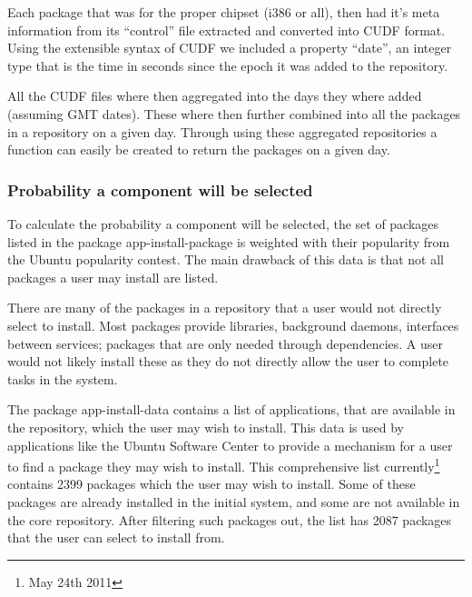Each package that was for the proper chipset (i386 or all), then had it's meta information from its ``control'' file extracted and converted into CUDF format.
Using the extensible syntax of CUDF we included a property ``date'', an integer type that is the time in seconds since the epoch it was added to the repository.

All the CUDF files where then aggregated into the days they where added (assuming GMT dates).
These where then further combined into all the packages in a repository on a given day.
Through using these aggregated repositories a function can easily be created to return the packages on a given day.

\subsubsection{Probability a component will be selected}
To calculate the probability a component will be selected, 
the set of packages listed in the package app-install-package is weighted with their popularity from the Ubuntu popularity contest.
The main drawback of this data is that not all packages a user may install are listed.

There are many of the packages in a repository that a user would not directly select to install.
Most packages provide libraries, background daemons, interfaces between services; packages that are only needed through dependencies.
A user would not likely install these as they do not directly allow the user to complete tasks in the system.

The package app-install-data contains a list of applications, that are available in the repository, which the user may wish to install.
This data is used by applications like the Ubuntu Software Center to provide a mechanism for a user to find a package they may wish to install.
This comprehensive list currently\footnote{May 24th 2011} contains 2399 packages which the user may wish to install.
Some of these packages are already installed in the initial system, and some are not available in the core repository.
After filtering such packages out, the list has 2087 packages that the user can select to install from. 

